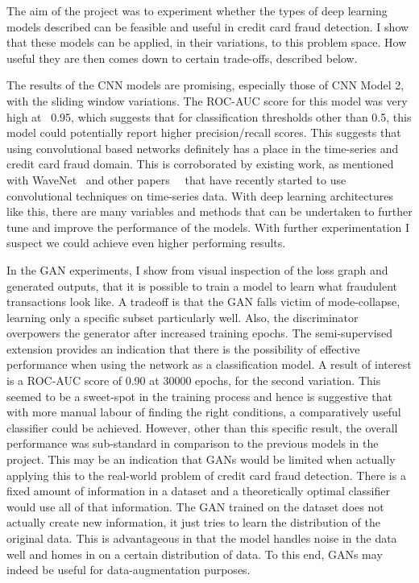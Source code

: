 \documentclass[12pt,a4paper,twoside]{report}
\begin{document}
The aim of the project was to experiment whether the types of deep learning models described can be feasible and useful in credit card fraud detection. I show that these models can be applied, in their variations, to this problem space. How useful they are then comes down to certain trade-offs, described below.

The results of the CNN models are promising, especially those of CNN Model 2, with the sliding window variations. The ROC-AUC score for this model was very high at ~0.95, which suggests that for classification thresholds other than 0.5, this model could potentially report higher precision/recall scores. This suggests that using convolutional based networks definitely has a place in the time-series and credit card fraud domain. This is corroborated by existing work, as mentioned with WaveNet~\cite{DBLP:journals/corr/OordDZSVGKSK16} and other papers~\cite{wang2017time}~\cite{7979885} that have recently started to use convolutional techniques on time-series data. With deep learning architectures like this, there are many variables and methods that can be undertaken to further tune and improve the performance of the models. With further experimentation I suspect we could achieve even higher performing results. 

In the GAN experiments, I show from visual inspection of the loss graph and generated outputs, that it is possible to train a model to learn what fraudulent transactions look like. A tradeoff is that the GAN falls victim of mode-collapse, learning only a specific subset particularly well. Also, the discriminator overpowers the generator after increased training epochs. The semi-supervised extension provides an  indication that there is the possibility of effective performance when using the network as a classification model. A result of interest is a ROC-AUC score of 0.90 at 30000 epochs, for the second variation. This seemed to be a sweet-spot in the training process and hence is suggestive that with more manual labour of finding the right conditions, a comparatively useful classifier could be achieved. However, other than this specific result, the overall performance was sub-standard in comparison to the previous models in the project. This may be an indication that GANs would be limited when actually applying this to the real-world problem of credit card fraud detection. There is a fixed amount of information in a dataset and a theoretically optimal classifier would use all of that information. The GAN trained on the dataset does not actually create new information, it just tries to learn the distribution of the original data. This is advantageous in that the model handles noise in the data well and homes in on a certain distribution of data. To this end, GANs may indeed be useful for data-augmentation purposes. 
\end{document}
